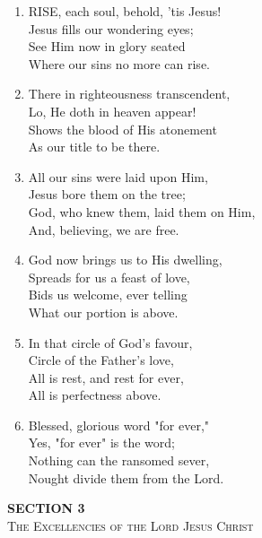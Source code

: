 \documentclass[11pt,a4paper]{article}
\begin{document}
\begin{enumerate}
    \item RISE, each soul, behold, 'tis Jesus! \\
        Jesus fills our wondering eyes; \\
        See Him now in glory seated \\
        Where our sins no more can rise.

    \item There in righteousness transcendent, \\
        Lo, He doth in heaven appear! \\
        Shows the blood of His atonement \\
        As our title to be there.

    \item All our sins were laid upon Him, \\
        Jesus bore them on the tree; \\
        God, who knew them, laid them on Him, \\
        And, believing, we are free.

    \item God now brings us to His dwelling, \\
        Spreads for us a feast of love, \\
        Bids us welcome, ever telling \\
        What our portion is above.

    \item In that circle of God's favour, \\
        Circle of the Father's love, \\
        All is rest, and rest for ever, \\
        All is perfectness above.

    \item Blessed, glorious word "for ever," \\
        Yes, "for ever" is the word; \\
        Nothing can the ransomed sever, \\
        Nought divide them from the Lord.

\end{enumerate}
\newpage
\thispagestyle{empty}
\vspace*{3.5cm}
\begin{center}
    {\LARGE \textbf{SECTION 3}}\\[0.8em]
    {\Large \textsc{The Excellencies of the Lord Jesus Christ}}
\end{center}
\vspace{3.5cm}
\end{document}
